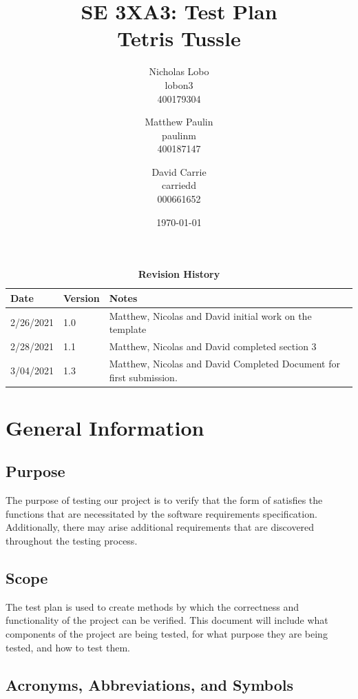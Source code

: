 \documentclass[12pt, titlepage]{article}
\title{SE 3XA3: Test Plan\\Tetris Tussle}
\author{Nicholas Lobo \\ lobon3 \\ 400179304 \and
	Matthew Paulin \\ paulinm \\ 400187147 \and
	David Carrie \\ carriedd \\ 000661652 \and
}
\date{\today}
\begin{document}
	
	\maketitle
	
	\tableofcontents
	\listoftables
	\listoffigures
	
	\begin{table}[bp]
		\caption{\bf Revision History}
		\begin{tabularx}{\textwidth}{p{3cm}p{2cm}X}
			\toprule {\bf Date} & {\bf Version} & {\bf Notes}\\
			\midrule
			2/26/2021 & 1.0 & Matthew, Nicolas and David initial work on the template\\
			2/28/2021 & 1.1 & Matthew, Nicolas and David completed section 3\\
			3/04/2021 & 1.3 & Matthew, Nicolas and David Completed Document for first submission.\\
			\bottomrule
		\end{tabularx}
	\end{table}
	
	\newpage
	
	
	
	\section{General Information}
	
	\subsection{Purpose}
	The purpose of testing our project is to verify that the form of satisfies the functions that are necessitated by the software requirements specification. Additionally, there may arise additional requirements that are discovered throughout the testing process.
	
	
	\subsection{Scope}
	The test plan is used to create methods by which the correctness and functionality of the project can be verified. This document will include what components of the project are being tested, for what purpose they are being tested, and how to test them. 
	\subsection{Acronyms, Abbreviations, and Symbols}
	
\end{document}
